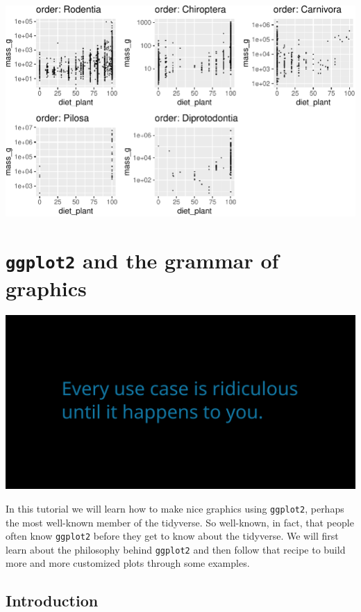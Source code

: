 \documentclass[]{book}
\begin{document}
\begin{center}\includegraphics[width=\textwidth]{TRES-Tidy-Tutorial_files/figure-latex/unnamed-chunk-104-1} \end{center}

\hypertarget{ggplot2-and-the-grammar-of-graphics}{%
\chapter{\texorpdfstring{\texttt{ggplot2} and the grammar of graphics}{ggplot2 and the grammar of graphics}}\label{ggplot2-and-the-grammar-of-graphics}}

\includegraphics{opening-image.png}

In this tutorial we will learn how to make nice graphics using \texttt{ggplot2}, perhaps the most well-known member of the tidyverse. So well-known, in fact, that people often know \texttt{ggplot2} before they get to know about the tidyverse. We will first learn about the philosophy behind \texttt{ggplot2} and then follow that recipe to build more and more customized plots through some examples.

\hypertarget{introduction-1}{%
\section{Introduction}\label{introduction-1}}
\end{document}

